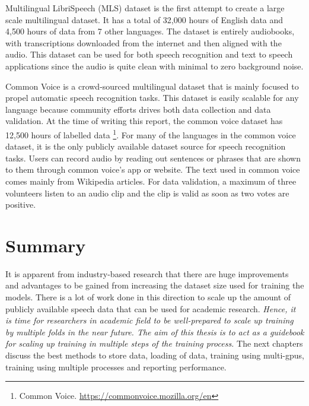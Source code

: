 Multilingual LibriSpeech (MLS) \cite{Pratap2020MLS:Research} dataset is the first attempt to create a large scale multilingual dataset. It has a total of 32,000 hours of English data and 4,500 hours of data from 7 other languages. The dataset is entirely audiobooks, with  transcriptions downloaded from the internet and then aligned with the audio. This dataset can be used for both speech recognition and text to speech applications since the audio is quite clean with minimal to zero background noise. 

Common Voice \cite{Ardila2020CommonCorpus} is a crowd-sourced multilingual dataset that is mainly focused to propel automatic speech recognition tasks. This dataset is easily scalable for any language because community efforts drives both data collection and data validation. At the time of writing this report, the common voice dataset has 12,500 hours of labelled data \footnote{Common Voice. \href{https://commonvoice.mozilla.org/en}{https://commonvoice.mozilla.org/en}}. For many of the languages in the common voice dataset, it is the only publicly available dataset source for speech recognition tasks. Users can record audio by reading out sentences or phrases that are shown to them through common voice's app or website. The text used in common voice comes mainly from Wikipedia articles. For data validation, a maximum of three volunteers listen to an audio clip and the clip is valid as soon as two votes are positive.

\section{Summary}
It is apparent from industry-based research that there are huge improvements and advantages to be gained from increasing the dataset size used for training the models. There is a lot of work done in this direction to scale up the amount of publicly available speech data that can be used for academic research. \emph{Hence, it is time for researchers in academic field to be well-prepared to scale up training by multiple folds in the near future. The aim of this thesis is to act as a guidebook for scaling up training in multiple steps of the training process.} The next chapters discuss the best methods to store data, loading of data, training using multi-\acrshort{gpu}s, training using multiple processes and reporting performance.

